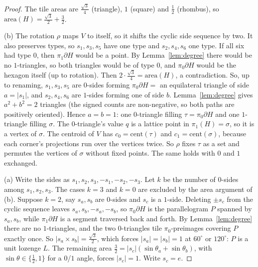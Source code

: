 \documentclass[11pt]{article}
\theoremstyle{definition}
\begin{document}
\begin{proof}
The tile areas are $\frac{\sqrt3}4$ (triangle), $1$ (square) and $\frac12$ (rhombus), so $\mathrm{area}(H)=\frac{\sqrt3}2+\frac32$.

(b) The rotation $\rho$ maps $V$ to itself, so it shifts the cyclic side sequence by two. It also preserves types, so $s_1,s_3,s_5$ have
one type and $s_2,s_4,s_6$ one type. If all six had type $0$, then $\pi_1\partial H$ would be a point. By Lemma~\ref{lem:degree} there
would be no $1$-triangles, so both triangles would be of type $0$, and $\pi_0\partial H$ would be the hexagon itself (up to rotation). Then
$2\cdot\frac{\sqrt3}4=\mathrm{area}(H)$, a contradiction. So, up to renaming, $s_1,s_3,s_5$ are $0$-sides forming
$\pi_0\partial H=$ an equilateral triangle of side $a=|s_1|$, and $s_2,s_4,s_6$ are $1$-sides forming one of side $b$. Lemma~\ref{lem:degree}
gives $a^2+b^2=2$ triangles (the signed counts are non-negative, so both paths are positively oriented). Hence $a=b=1$: one
$0$-triangle filling $\tau=\pi_0\partial H$ and one $1$-triangle filling $\sigma$. The $0$-triangle's value $q$ is a lattice point in
$\pi_1(H)=\sigma$, so it is a vertex of $\sigma$. The centroid of $V$ has $c_0=\mathrm{cent}(\tau)$ and $c_1=\mathrm{cent}(\sigma)$,
because each corner's projections run over the vertices twice. So $\rho$ fixes $\tau$ as a set and permutes the vertices of $\sigma$
without fixed points. The same holds with $0$ and $1$ exchanged.

(a) Write the sides as $s_1,s_2,s_3,-s_1,-s_2,-s_3$. Let $k$ be the number of $0$-sides among $s_1,s_2,s_3$. The cases $k=3$ and $k=0$ are
excluded by the area argument of (b). Suppose $k=2$, say $s_a,s_b$ are $0$-sides and $s_c$ is a $1$-side. Deleting $\pm s_c$ from the cyclic
sequence leaves $s_a,s_b,-s_a,-s_b$, so $\pi_0\partial H$ is the parallelogram $P$ spanned by $s_a,s_b$, while $\pi_1\partial H$ is a segment
traversed back and forth. By Lemma~\ref{lem:degree} there are no $1$-triangles, and the two $0$-triangles tile $\pi_0$-preimages covering $P$
exactly once. So $|s_a\times s_b|=\frac{\sqrt3}2$, which forces $|s_a|=|s_b|=1$ at $60^\circ$ or $120^\circ$: $P$ is a unit lozenge $L$.
The remaining area $\frac32=|s_c|(\sin\theta_a+\sin\theta_b)$, with $\sin\theta\in\{\frac12,1\}$ for a $0$/$1$ angle, forces $|s_c|=1$. Write
$s_c=e$.


\end{proof}
\end{document}

